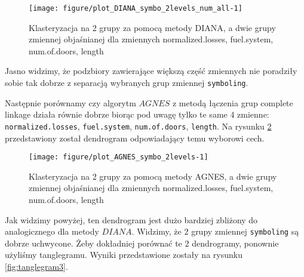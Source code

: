 \documentclass[12pt, a4paper]{article}\usepackage[]{graphicx}\usepackage[]{xcolor}
\makeatletter
\def\maxwidth{ %
  \ifdim\Gin@nat@width>\linewidth
    \linewidth
  \else
    \Gin@nat@width
  \fi
}
\newenvironment{knitrout}{}{} %
\makeatother
\begin{document}
\begin{knitrout}
\color{fgcolor}\begin{figure}[H]

{\centering \texttt{[image: figure/plot\_DIANA\_symbo\_2levels\_num\_all-1]} 

}

\caption[Klasteryzacja na 2 grupy za pomocą metody DIANA, a dwie grupy zmiennej objaśnianej dla zmiennych normalized.losses, fuel.system, num.of.doors, length]{Klasteryzacja na 2 grupy za pomocą metody DIANA, a dwie grupy zmiennej objaśnianej dla zmiennych normalized.losses, fuel.system, num.of.doors, length}\label{fig:plot_DIANA_symbo_2levels_num_all}
\end{figure}

\end{knitrout}

Jasno widzimy, że podzbiory zawierające większą część zmiennych nie poradziły sobie tak dobrze z separacją wybranych grup zmiennej \texttt{symboling}.
\par Następnie porównamy czy algorytm $AGNES$ z metodą łączenia grup complete linkage działa równie dobrze biorąc pod uwagę tylko te same $4$ zmienne: \texttt{normalized.losses}, \texttt{fuel.system}, \texttt{num.of.doors}, \texttt{length}. Na rysunku \ref{fig:plot_AGNES_symbo_2levels} przedstawiony został dendrogram odpowiadający temu wyborowi cech.
\begin{knitrout}
\color{fgcolor}\begin{figure}[H]

{\centering \texttt{[image: figure/plot\_AGNES\_symbo\_2levels-1]} 

}

\caption[Klasteryzacja na 2 grupy za pomocą metody AGNES, a dwie grupy zmiennej objaśnianej dla zmiennych normalized.losses, fuel.system, num.of.doors, length]{Klasteryzacja na 2 grupy za pomocą metody AGNES, a dwie grupy zmiennej objaśnianej dla zmiennych normalized.losses, fuel.system, num.of.doors, length}\label{fig:plot_AGNES_symbo_2levels}
\end{figure}

\end{knitrout}

Jak widzimy powyżej, ten dendrogram jest dużo bardziej zbliżony do analogicznego dla metody $DIANA$. Widzimy, że $2$ grupy zmiennej \texttt{symboling} są dobrze uchwycone. Żeby dokładniej porównać te $2$ dendrogramy, ponownie użyliśmy tanglegramu. Wyniki przedstawione zostały na rysunku \ref{fig:tanglegram3}.
\end{document}
